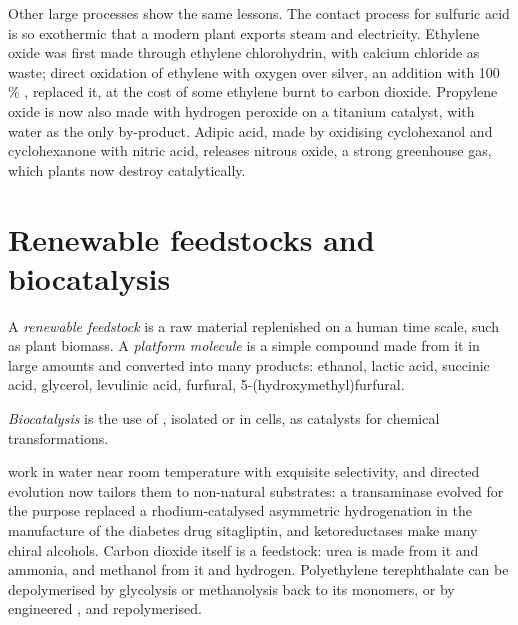 Other large processes show the same lessons. The contact process for sulfuric
acid is so exothermic that a modern plant exports steam and electricity.
Ethylene oxide was first made through ethylene chlorohydrin, with calcium
chloride as waste; direct oxidation of ethylene with oxygen over silver, an
addition with 100\,\% , replaced it, at the cost of some ethylene burnt to
carbon dioxide. Propylene oxide is now also made with hydrogen peroxide on a
titanium  catalyst, with water as the only by-product. Adipic acid,
made by oxidising cyclohexanol and cyclohexanone with nitric acid, releases
nitrous oxide, a strong greenhouse gas, which plants now destroy catalytically.

\section{Renewable feedstocks and biocatalysis}

\begin{definition}\label{def:b3:green-industrial:feedstock}
A \emph{renewable feedstock} is a raw material
replenished on a human time scale, such as plant biomass. A \emph{platform
molecule} is a simple compound made from it in large
amounts and converted into many products: ethanol, lactic acid, succinic acid,
glycerol, levulinic acid, furfural, 5-(hydroxymethyl)furfural.
\end{definition}

\begin{definition}[Biocatalysis]\label{def:b3:green-industrial:biocatalysis}
\emph{Biocatalysis} is the use of , isolated or in
cells, as catalysts for chemical transformations.
\end{definition}

 work in water near room temperature with exquisite selectivity, and
directed evolution now tailors them to non-natural substrates: a transaminase
evolved for the purpose replaced a rhodium-catalysed asymmetric hydrogenation
in the manufacture of the diabetes drug sitagliptin, and ketoreductases make many
chiral alcohols. Carbon dioxide itself is a feedstock: urea is made from it and
ammonia, and methanol from it and hydrogen. Polyethylene terephthalate can be
depolymerised by glycolysis or methanolysis back to its monomers, or by
engineered , and repolymerised.

